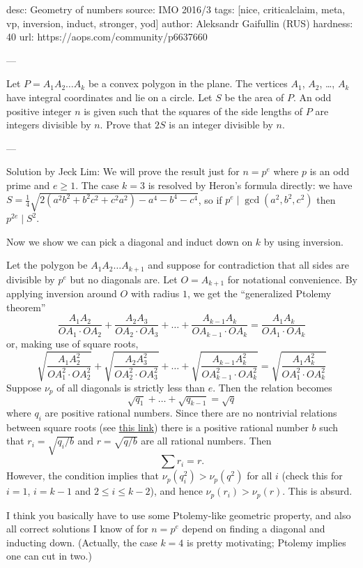 desc:  Geometry of numbers
source:  IMO 2016/3
tags:  [nice, criticalclaim, meta, vp, inversion, induct, stronger, yod]
author: Aleksandr Gaifullin (RUS)
hardness: 40
url: https://aops.com/community/p6637660

---

Let $P=A_1A_2\dots A_k$ be a convex polygon in the plane.
The vertices $A_1$, $A_2$, \dots, $A_k$ have integral coordinates
and lie on a circle. Let $S$ be the area of $P$.
An odd positive integer $n$ is given such that
the squares of the side lengths of $P$ are integers divisible by $n$.
Prove that $2S$ is an integer divisible by $n$.

---

Solution by Jeck Lim:
We will prove the result just for $n = p^e$
where $p$ is an odd prime and $e \ge 1$.
The case $k=3$ is resolved by Heron's formula directly:
we have $S = \frac14\sqrt{2(a^2b^2 + b^2c^2 + c^2a^2) - a^4-b^4-c^4}$,
so if $p^e \mid \gcd(a^2,b^2,c^2)$ then $p^{2e} \mid S^2$.

Now we show we can pick a diagonal and induct down on $k$ by using inversion.

Let the polygon be $A_1 A_2 \dots A_{k+1}$
and suppose for contradiction that all sides are divisible by $p^e$
but no diagonals are.
Let $O = A_{k+1}$ for notational convenience.
By applying inversion around $O$ with radius $1$,
we get the ``generalized Ptolemy theorem''
\[
  \frac{A_1A_2}{OA_1 \cdot OA_2}
  + \frac{A_2A_3}{OA_2 \cdot OA_3}
  + \dots
  + \frac{A_{k-1} A_k}{OA_{k-1} \cdot OA_k}
  = \frac{A_1 A_k}{OA_1 \cdot OA_k}
\]
or, making use of square roots,
\[
  \sqrt{\frac{A_1A_2^2}{OA_1^2 \cdot OA_2^2}}
  + \sqrt{\frac{A_2A_3^2}{OA_2^2 \cdot OA_3^2}}
  + \dots
  + \sqrt{\frac{A_{k-1} A_k^2}{OA_{k-1}^2 \cdot OA_k^2}}
  = \sqrt{\frac{A_1 A_k^2}{OA_1^2 \cdot OA_k^2}}
\]
Suppose $\nu_p$ of all diagonals is strictly less than $e$.
Then the relation becomes
\[ \sqrt{q_1} + \dots + \sqrt{q_{k-1}} = \sqrt q \]
where $q_i$ are positive rational numbers.
Since there are no nontrivial relations between square roots
(see \href{https://qchu.wordpress.com/2009/07/02/square-roots-have-no-unexpected-linear-relationships/}{this link})
there is a positive rational number $b$
such that $r_i = \sqrt{q_i/b}$ and $r = \sqrt{q/b}$
are all rational numbers.
Then
\[ \sum r_i = r. \]
However, the condition implies that $\nu_p(q_i^2) > \nu_p(q^2)$ for all $i$
(check this for $i=1$, $i=k-1$ and $2 \le i \le k-2$),
and hence $\nu_p(r_i) > \nu_p(r)$.
This is absurd.

\begin{remark*}
  I think you basically have to use some Ptolemy-like geometric property,
  and also all correct solutions I know of for $n = p^e$
  depend on finding a diagonal and inducting down.
  (Actually, the case $k=4$ is pretty motivating;
  Ptolemy implies one can cut in two.)
\end{remark*}

